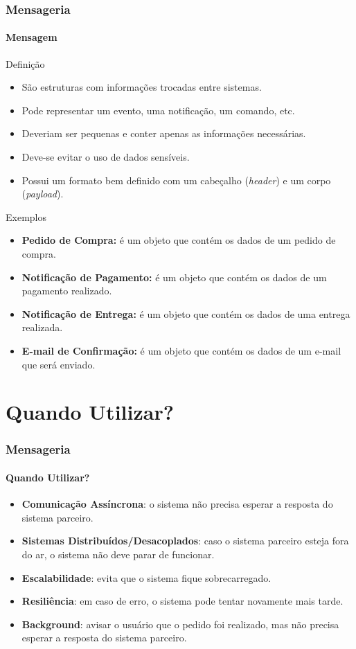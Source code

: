 \documentclass[
	9pt, %
	t, %
]{beamer}
\begin{document}
\begin{frame}
	\frametitle{Mensageria}
	\framesubtitle{Mensagem}

	\begin{block}{Definição}
		\begin{itemize}
			\item São estruturas com informações trocadas entre sistemas.
			\item Pode representar um evento, uma notificação, um comando, etc.
			\item Deveriam ser pequenas e conter apenas as informações necessárias.
			\item Deve-se evitar o uso de dados sensíveis.
			\item Possui um formato bem definido com um cabeçalho (\textit{header}) e um corpo
			      (\textit{payload}).
		\end{itemize}
	\end{block}

	\begin{block}{Exemplos}
		\begin{itemize}
			\item \textbf{Pedido de Compra:} é um objeto que contém os dados de um pedido de compra.
			\item \textbf{Notificação de Pagamento:} é um objeto que contém os dados de um pagamento realizado.
			\item \textbf{Notificação de Entrega:} é um objeto que contém os dados de uma entrega realizada.
			\item \textbf{E-mail de Confirmação:} é um objeto que contém os dados de um e-mail que será enviado.
		\end{itemize}
	\end{block}
\end{frame}

\section{Quando Utilizar?}

\begin{frame}
	\frametitle{Mensageria}
	\framesubtitle{Quando Utilizar?}

	\begin{itemize}
		\item \textbf{Comunicação Assíncrona}: o sistema não precisa esperar a resposta do sistema parceiro.
		\item \textbf{Sistemas Distribuídos/Desacoplados}: caso o sistema parceiro esteja fora do ar, o sistema não deve parar de funcionar.
		\item \textbf{Escalabilidade}: evita que o sistema fique sobrecarregado.
		\item \textbf{Resiliência}: em caso de erro, o sistema pode tentar novamente mais tarde.
		\item \textbf{Background}: avisar o usuário que o pedido foi realizado, mas não precisa esperar a resposta do sistema parceiro.
	\end{itemize}

\end{frame}
\end{document}
